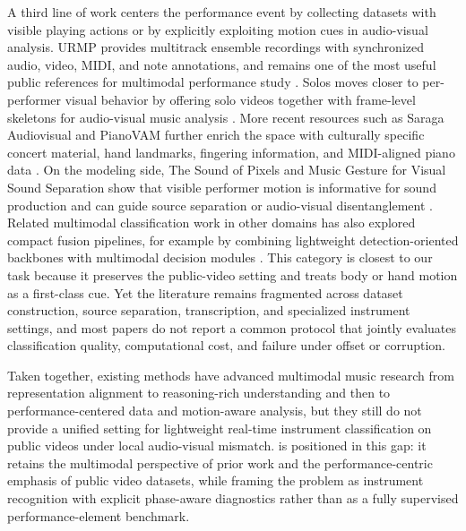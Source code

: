 A third line of work centers the performance event by collecting datasets with visible playing actions or by explicitly exploiting motion cues in audio-visual analysis. URMP provides multitrack ensemble recordings with synchronized audio, video, MIDI, and note annotations, and remains one of the most useful public references for multimodal performance study \citep{Li2019URMP}. Solos moves closer to per-performer visual behavior by offering solo videos together with frame-level skeletons for audio-visual music analysis \citep{Montesinos2020Solos}. More recent resources such as Saraga Audiovisual and PianoVAM further enrich the space with culturally specific concert material, hand landmarks, fingering information, and MIDI-aligned piano data \citep{Shankar2024SaragaAV,Kim2025PianoVAM}. On the modeling side, The Sound of Pixels and Music Gesture for Visual Sound Separation show that visible performer motion is informative for sound production and can guide source separation or audio-visual disentanglement \citep{Zhao2018SoundOfPixels,Gan2020MusicGesture}. Related multimodal classification work in other domains has also explored compact fusion pipelines, for example by combining lightweight detection-oriented backbones with multimodal decision modules \citep{Poloju2024MultimodalFusion}. This category is closest to our task because it preserves the public-video setting and treats body or hand motion as a first-class cue. Yet the literature remains fragmented across dataset construction, source separation, transcription, and specialized instrument settings, and most papers do not report a common protocol that jointly evaluates classification quality, computational cost, and failure under offset or corruption.

Taken together, existing methods have advanced multimodal music research from representation alignment to reasoning-rich understanding and then to performance-centered data and motion-aware analysis, but they still do not provide a unified setting for lightweight real-time instrument classification on public videos under local audio-visual mismatch. \method{} is positioned in this gap: it retains the multimodal perspective of prior work and the performance-centric emphasis of public video datasets, while framing the problem as instrument recognition with explicit phase-aware diagnostics rather than as a fully supervised performance-element benchmark.
